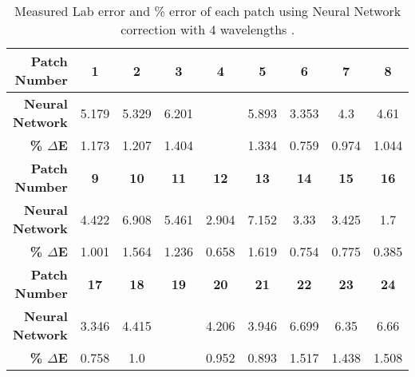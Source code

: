 \begin{table}[H]
  \caption{Measured Lab error and \% error of each patch using Neural Network correction with 4 wavelengths .}\n  \begin{center}
    \begin{tabularx}{\textwidth}{r c c c c c c c c}
    \toprule
        \textbf{Patch Number} & \textbf{1} & \textbf{2} & \textbf{3} & \textbf{4} & \textbf{5} & \textbf{6} & \textbf{7} & \textbf{8}\\ \midrule 
        \textbf{Neural Network} &5.179 &5.329 &6.201 &\cellcolor{colorred}{7.442} &5.893 &3.353 &4.3 &4.61\\ 
        \textbf{\textbf{\% $\Delta$E}} &1.173 &1.207 &1.404 &\cellcolor{colorred}{1.685} &1.334 &0.759 &0.974 &1.044\\ \midrule 
        \textbf{Patch Number} & \textbf{9} & \textbf{10} & \textbf{11} & \textbf{12} & \textbf{13} & \textbf{14} & \textbf{15} & \textbf{16}\\ \midrule 
        \textbf{Neural Network} &4.422 &6.908 &5.461 &2.904 &7.152 &3.33 &3.425 &1.7\\ 
        \textbf{\textbf{\% $\Delta$E}} &1.001 &1.564 &1.236 &0.658 &1.619 &0.754 &0.775 &0.385\\ \midrule 
        \textbf{Patch Number} & \textbf{17} & \textbf{18} & \textbf{19} & \textbf{20} & \textbf{21} & \textbf{22} & \textbf{23} & \textbf{24}\\ \midrule 
        \textbf{Neural Network} &3.346 &4.415 &\cellcolor{colorgreen}{1.316} &4.206 &3.946 &6.699 &6.35 &6.66\\ 
        \textbf{\textbf{\% $\Delta$E}} &0.758 &1.0 &\cellcolor{colorgreen}{0.298} &0.952 &0.893 &1.517 &1.438 &1.508\\ \midrule 
    \bottomrule
    \end{tabularx}
  \end{center}
\end{table}
